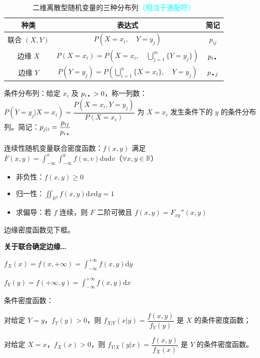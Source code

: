 \documentclass[UTF8]{ctexart}
\newcommand\Concept[1]{\textcolor{cyan!70!black}{#1}}
\renewcommand\d{\mathrm{d}}
\begin{document}
\begin{table}[htb]
  \centering
  \begin{tabular}{ccc}
  \toprule
    种类 & 表达式 & 简记 \\
  \midrule
    联合 $(X,Y)$ & $P(X=x_i,\quad Y=y_j)$ & $p_{ij}$ \\
    边缘 $X$ & $P(X=x_i) = P\left(X=x_i,\quad  \bigcup\limits_{j=1}^m \{Y=y_j\} \right)$ & $p_{i\text{\textbullet}}$ \\
    边缘 $Y$ & $P(Y=y_j) = P\left(\bigcup\limits_{i=1}^n\{X=x_i\},\quad  Y=y_j \right)$ & $p_{\text{\textbullet}j}$ \\
  \bottomrule
  \end{tabular}
  \caption{二维离散型随机变量的三种分布列\textcolor{cyan}{（\textbullet 相当于通配符）}}\label{tab:2-d discrete}
\end{table}

\Concept{条件分布列}：给定 $x_i$ 及 $p_{i\text{\textbullet}}>0$，称一列数：$P(Y=y_j|X=x_i) = \dfrac{P(X=x_i,Y=y_j)}{P(X=x_i)}$ 为 $X=x_i$ 发生条件下的 $y$ 的条件分布列。简记：$p_{j|i} = \dfrac{p_{ij}}{p_{i\text{\textbullet}}}$

连续性随机变量\Concept{联合密度函数}：$f(x,y)$ 满足 $\displaystyle F(x,y)=\int_{-\infty}^x \int_{-\infty}^y  f(u,v)\d u\d v$（$\forall x,y\in\mathbb{R}$）
\begin{itemize}[itemsep=0pt,parsep=0pt]
\color{gray!80!white}
    \item 非负性：$f(x,y)\geqslant 0$
    \item 归一性：$\displaystyle\iint_{\mathbb{R}^2} f(x,y)\d x\d y = 1$
    \item 求偏导：若 $f$ 连续，则 $F$ 二阶可微且 $f(x,y)=F_{xy}''(x,y)$
\end{itemize}

\Concept{边缘密度函数}见下框。
\begin{mybox}
\textbf{关于联合确定边缘…}

$\displaystyle f_X(x) = f(x,+\infty) = \int_{-\infty}^{+\infty} f(x,y)\d y$

\vspace{1em}
$\displaystyle f_Y(y) = f(+\infty,y) = \int_{-\infty}^{+\infty} f(x,y)\d x$

\end{mybox}

\Concept{条件密度函数}：

对给定 $Y=y$，$f_Y(y)>0$，则 $f_{X|Y}(x|y) = \dfrac{f(x,y)}{f_Y(y)}$ 是 $X$ 的条件密度函数；

对给定 $X=x$，$f_X(x)>0$，则 $f_{Y|X}(y|x) = \dfrac{f(x,y)}{f_X(x)}$ 是 $Y$ 的条件密度函数。
\end{document}
